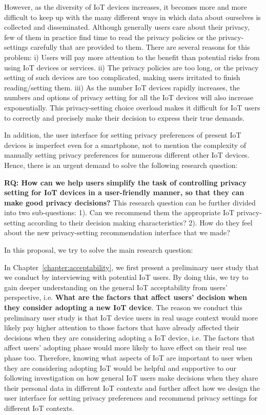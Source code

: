 However, as the diversity of IoT devices increases, it becomes more and more difficult to keep up with the many different ways in which data about ourselves is collected and disseminated. Although generally users care about their privacy, few of them in practice find time to read the privacy policies or the privacy-settings carefully that are provided to them. There are several reasons for this problem: i) Users will pay more attention to the benefit than potential risks from using IoT devices or services. ii) The privacy policies are too long, or the privacy setting of such devices are too complicated, making users irritated to finish reading/setting them. iii) As the number IoT devices rapidly increases, the numbers and options of privacy setting for all the IoT devices will also increase exponentially. This privacy-setting choice overload makes it difficult for IoT users to correctly and precisely make their decision to express their true demands. 

In addition, the user interface for setting privacy preferences of present IoT devices is imperfect even for a smartphone, not to mention the complexity of manually setting privacy preferences for numerous different other IoT devices. Hence, there is an urgent demand to solve the following research question: 

\textbf{RQ: How can we help users simplify the task of controlling privacy setting for IoT devices in a user-friendly manner, so that they can make good privacy decisions?} This research question can be further divided into two sub-questions: 1). Can we recommend them the appropriate IoT privacy-setting according to their decision making characteristics? 2). How do they feel about the new privacy-setting recommendation interface that we made?

In this proposal, we try to solve the main research question:

In Chapter~\ref{chapter:acceptability}, we first present a preliminary user study that we conduct by interviewing with potential IoT users. By doing this, we try to gain deeper understanding on the general IoT acceptability from users' perspective, i.e. \textbf{What are the factors that affect users' decision when they consider adopting a new IoT device}. The reason we conduct this preliminary user study is that IoT device users in real usage context would more likely pay higher attention to those factors that have already affected their decisions when they are considering adopting a IoT device, i.e. The factors that affect users' adopting phase would more likely to have effect on their real use phase too. Therefore, knowing what aspects of IoT are important to user when they are considering adopting IoT would be helpful and supportive to our following investigation on how general IoT users make decisions when they share their personal data in different IoT contexts and further affect how we design the user interface for setting privacy preferences and recommend privacy settings for different IoT contexts.
	
